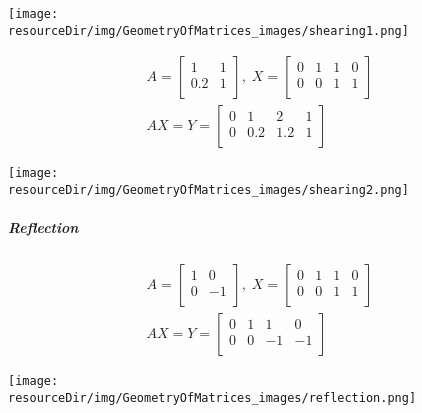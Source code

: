 \documentclass[../MathsNotesBase.tex]{subfiles}
\begin{document}
{		\begin{center}
		\texttt{[image: \\resourceDir/img/GeometryOfMatrices\_images/shearing1.png]}
		\end{center}
		
		\begin{align*}
		A =
		\begin{bmatrix}    
		1  &  1 \\
		0.2  &  1 \\		
		\end{bmatrix}
		,\; X = 
		\begin{bmatrix}  
		0   &  1  &   1  &   0 \\
		0   &  0  &   1  &   1	\\	
		\end{bmatrix} \\[10pt]
		AX = Y = 
		\begin{bmatrix}   
		0  &   1  &  2  &  1 \\
		0  &   0.2  &  1.2  &  1 \\
		\end{bmatrix}
		\end{align*}
	
		\begin{center}
		\texttt{[image: \\resourceDir/img/GeometryOfMatrices\_images/shearing2.png]}
		\end{center}
		
		\subparagraph{Reflection}
		\begin{align*}
		A =
		\begin{bmatrix}    
		1  &  0 \\
		0  &  -1 \\		
		\end{bmatrix}
		,\; X = 
		\begin{bmatrix}  
		0   &  1  &   1  &   0 \\
		0   &  0  &   1  &   1	\\	
		\end{bmatrix} \\[10pt]
		AX = Y = 
		\begin{bmatrix}   
		0  &   1  &  1  &  0 \\
		0  &   0  &  -1  &  -1 \\
		\end{bmatrix}
		\end{align*}
	
		\begin{center}
		\texttt{[image: \\resourceDir/img/GeometryOfMatrices\_images/reflection.png]}
		\end{center}
	}
	
\end{document}
